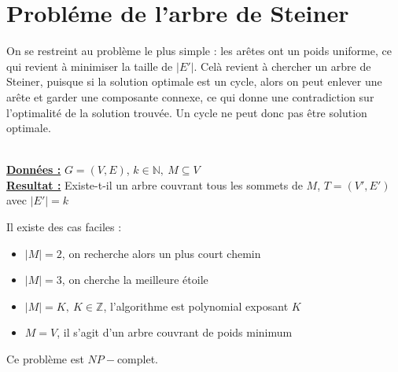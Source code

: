 \documentclass[a4paper,11pt]{thesis}
\begin{document}
\section{Probl\'{e}me de l'arbre de Steiner}

On se restreint au problème le plus simple : les arêtes ont un poids uniforme, ce qui revient à
minimiser la taille de $|E'|$. Celà revient à chercher un arbre de Steiner, puisque si la solution
optimale est un cycle, alors on peut enlever une arête et garder une composante connexe, ce qui
donne une contradiction sur l'optimalité de la solution trouvée. Un cycle ne peut donc pas être
solution optimale.

\begin{df}
    ~\\
    \textbf{\underline{Données :}} $G = (V, E)$, $k \in \mathbb{N},\ M \subseteq V$\\
    \textbf{\underline{Resultat :}} Existe-t-il un arbre couvrant tous les sommets de $M$, $T = (V',
    E')$ avec $|E'| = k$
\end{df}

Il existe des cas faciles : 
\begin{itemize}
    \item $|M| = 2$, on recherche alors un plus court chemin
    \item $|M| = 3$, on cherche la meilleure étoile
    \item $|M| = K,\ K \in \mathbb{Z}$, l'algorithme est polynomial exposant $K$
    \item $M = V$, il s'agit d'un arbre couvrant de poids minimum
\end{itemize}

\begin{thrm}
    Ce problème est $NP-$complet.
\end{thrm}
\end{document}
